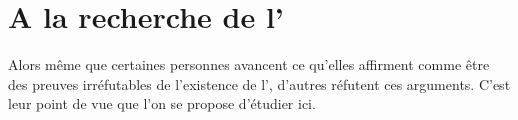 \section{A la recherche de l'\op}
Alors même que certaines personnes avancent ce qu'elles affirment comme être des preuves irréfutables de l'existence de l'\op, d'autres réfutent ces arguments.
C'est leur point de vue que l'on se propose d'étudier ici.